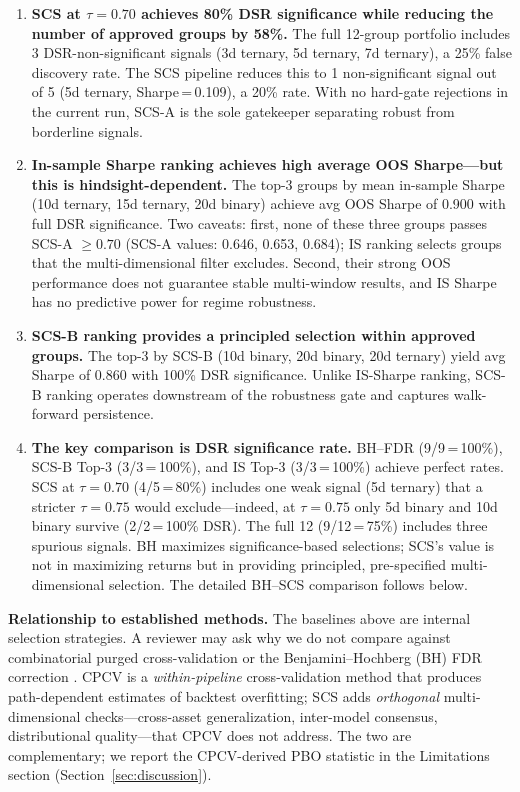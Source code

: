 \documentclass[12pt,a4paper]{article}
\begin{document}
\begin{enumerate}
  \item \textbf{SCS at $\tau=0.70$ achieves 80\% DSR significance while reducing the number of approved groups by 58\%.} The full 12-group portfolio includes 3 DSR-non-significant signals (3d ternary, 5d ternary, 7d ternary), a 25\% false discovery rate. The SCS pipeline reduces this to 1 non-significant signal out of 5 (5d ternary, Sharpe\,=\,0.109), a 20\% rate. With no hard-gate rejections in the current run, SCS-A is the sole gatekeeper separating robust from borderline signals.

  \item \textbf{In-sample Sharpe ranking achieves high average OOS Sharpe---but this is hindsight-dependent.} The top-3 groups by mean in-sample Sharpe (10d ternary, 15d ternary, 20d binary) achieve avg OOS Sharpe of 0.900 with full DSR significance. Two caveats: first, none of these three groups passes SCS-A $\geq 0.70$ (SCS-A values: 0.646, 0.653, 0.684); IS ranking selects groups that the multi-dimensional filter excludes. Second, their strong OOS performance does not guarantee stable multi-window results, and IS Sharpe has no predictive power for regime robustness.

  \item \textbf{SCS-B ranking provides a principled selection within approved groups.} The top-3 by SCS-B (10d binary, 20d binary, 20d ternary) yield avg Sharpe of 0.860 with 100\% DSR significance. Unlike IS-Sharpe ranking, SCS-B ranking operates downstream of the robustness gate and captures walk-forward persistence.

  \item \textbf{The key comparison is DSR significance rate.} BH--FDR (9/9\,=\,100\%), SCS-B Top-3 (3/3\,=\,100\%), and IS Top-3 (3/3\,=\,100\%) achieve perfect rates. SCS at $\tau=0.70$ (4/5\,=\,80\%) includes one weak signal (5d ternary) that a stricter $\tau=0.75$ would exclude---indeed, at $\tau=0.75$ only 5d binary and 10d binary survive (2/2\,=\,100\% DSR). The full 12 (9/12\,=\,75\%) includes three spurious signals. BH maximizes significance-based selections; SCS's value is not in maximizing returns but in providing principled, pre-specified multi-dimensional selection. The detailed BH--SCS comparison follows below.
\end{enumerate}

\textbf{Relationship to established methods.} The baselines above are internal selection strategies. A reviewer may ask why we do not compare against combinatorial purged cross-validation \citep[CPCV;][]{bailey2017probability} or the Benjamini--Hochberg (BH) FDR correction \citep{benjamini1995controlling}. CPCV is a \emph{within-pipeline} cross-validation method that produces path-dependent estimates of backtest overfitting; SCS adds \emph{orthogonal} multi-dimensional checks---cross-asset generalization, inter-model consensus, distributional quality---that CPCV does not address. The two are complementary; we report the CPCV-derived PBO statistic in the Limitations section (Section~\ref{sec:discussion}).
\end{document}

